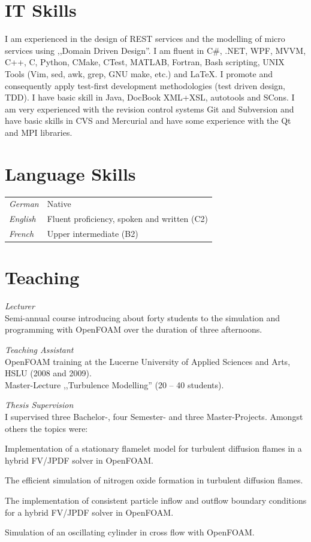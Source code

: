 \documentclass[line,11pt,a4paper]{../resume}
\begin{document}
\begin{resume}
\section{\mysidestyle IT Skills}\vspace{2mm}
I am experienced in the design of REST services and the modelling of micro
services using ,,Domain Driven Design''. I am fluent in C\#, .NET, WPF, MVVM,
C++, C, Python, CMake, CTest, MATLAB, Fortran, Bash scripting, UNIX Tools (Vim,
sed, awk, grep, GNU make, etc.) and {\selectfont\LaTeX}.
I promote and consequently apply test-first development methodologies (test
driven design, TDD). I have basic skill in Java, DocBook XML+XSL, autotools and
SCons. I am very experienced with the revision control systems Git and
Subversion and have basic skills in CVS and Mercurial and have some experience
with the Qt and MPI libraries.

\section{\mysidestyle Language Skills}\vspace{2mm}
\begin{tabular}{@{}ll}
  \textsl{German}   & Native \\
  \textsl{English}  & Fluent proficiency, spoken and written (C2) \\
  \textsl{French}  & Upper intermediate (B2) \\
\end{tabular}

\section{\mysidestyle Teaching}\vspace{2mm}

\textsl{Lecturer}\\
Semi-annual course introducing about forty students to the simulation and
programming with OpenFOAM over the duration of three afternoons.

\textsl{Teaching Assistant}\\
OpenFOAM training at the Lucerne University of Applied Sciences and Arts, HSLU
(2008 and 2009). \\
Master-Lecture ,,Turbulence Modelling'' (20 -- 40 students).

\textsl{Thesis Supervision}\\
I supervised three Bachelor-, four Semester- and three Master-Projects. Amongst
others the topics were:
\begin{list2}
  \item Implementation of a stationary flamelet model for turbulent diffusion
    flames in a hybrid FV/JPDF solver in OpenFOAM.
  \item The efficient simulation of nitrogen oxide formation in turbulent
    diffusion flames.
  \item The implementation of consistent particle inflow and outflow boundary
    conditions for a hybrid FV/JPDF solver in OpenFOAM.
  \item Simulation of an oscillating cylinder in cross flow with OpenFOAM.
\end{list2}


\end{resume}
\end{document}
